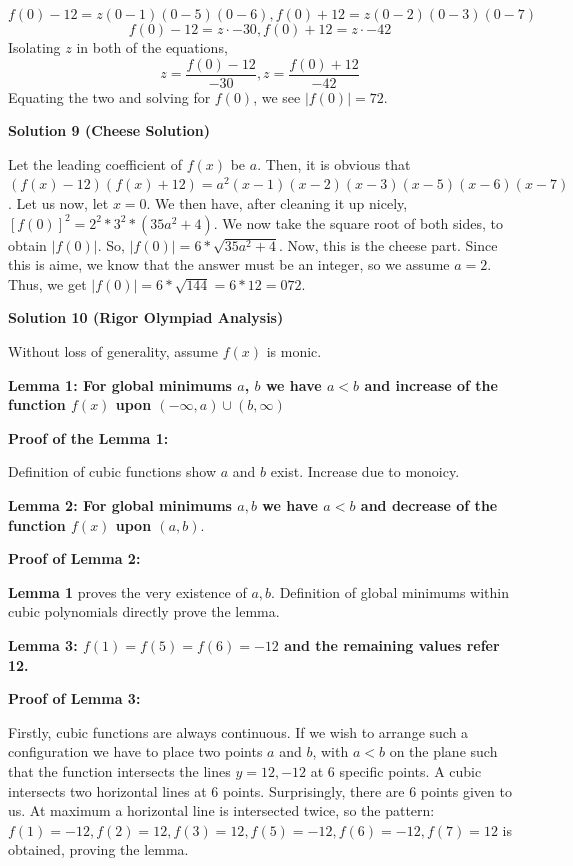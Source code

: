 \begin{enumerate}
 
 \[f(0) - 12 = z(0-1)(0-5)(0-6), f(0) + 12 = z(0-2)(0-3)(0-7)\] 
 \[f(0) - 12 = z\cdot -30, f(0) + 12 = z\cdot -42\]Isolating $z$ in both of the equations, 
 \[z = \frac{f(0)-12}{-30}, z = \frac{f(0) + 12}{-42}\]Equating the two and solving for $f(0)$, we see $|f(0)| = 72$.

 



\textbf{Solution 9 (Cheese Solution)}

Let the leading coefficient of  $f(x)$ be $a$. Then, it is obvious that $(f(x) - 12)(f(x) + 12) = a^2(x - 1)(x - 2)(x - 3)(x - 5)(x - 6)(x - 7)$. Let us now, let $x = 0$. We then have, after cleaning it up nicely, $[f(0)]^2 = 2^2 * 3^2 * (35a^2 + 4)$. We now take the square root of both sides, to obtain $|f(0)|$. So, $|f(0)| = 6 * \sqrt{35a^2 + 4}$. Now, this is the cheese part. Since this is aime, we know that the answer must be an integer, so we assume $a = 2$. Thus, we get $|f(0)| = 6 * \sqrt{144} = 6 * 12 = 072$.

 



\textbf{Solution 10 (Rigor Olympiad Analysis)}

Without loss of generality, assume $f(x)$ is monic.

 \textbf{Lemma 1: For global minimums $a$, $b$ we have $a < b$ and increase of the function $f(x)$ upon $(-\infty, a) \cup (b, \infty)$}

 \textbf{Proof of the Lemma 1:}

 Definition of cubic functions show $a$ and $b$ exist. Increase due to monoicy. 

 \textbf{Lemma 2: For global minimums $a,b$ we have $a<b$ and decrease of the function $f(x)$ upon $(a,b)$}.

 \textbf{Proof of Lemma 2:}

 \textbf{Lemma 1} proves the very existence of $a,b$. Definition of global minimums within cubic polynomials directly prove the lemma.

 \textbf{Lemma 3: $f(1) = f(5) = f(6) =- 12$ and the remaining values refer 12.}

 \textbf{Proof of Lemma 3:}

 Firstly, cubic functions are always continuous. If we wish to arrange such a configuration we have to place two points $a$ and $b$, with $a < b$ on the plane such that the function intersects the lines $y = 12, -12$ at 6 specific points. A cubic intersects two horizontal lines at 6 points. Surprisingly, there are 6 points given to us. At maximum a horizontal line is intersected twice, so the pattern: $f(1) = -12, f(2) = 12, f(3) = 12, f(5) = -12, f(6) = -12, f(7) = 12$ is obtained, proving the lemma.


\end{enumerate}

